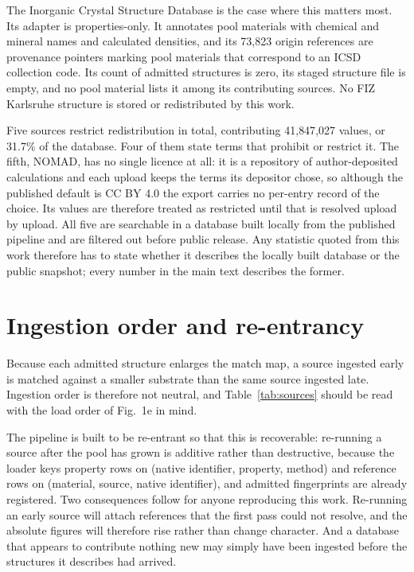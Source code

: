 The Inorganic Crystal Structure Database is the case where this matters most. Its
adapter is properties-only. It annotates pool materials with chemical and mineral
names and calculated densities, and its 73{,}823 origin references are provenance
pointers marking pool materials that correspond to an ICSD collection code. Its
count of admitted structures is zero, its staged structure file is empty, and no
pool material lists it among its contributing sources. No FIZ Karlsruhe structure is
stored or redistributed by this work.

Five sources restrict redistribution in total, contributing 41{,}847{,}027
values, or 31.7\% of the database. Four of them state terms that prohibit or
restrict it. The fifth, NOMAD, has no single licence at all: it is a repository
of author-deposited calculations and each upload keeps the terms its depositor
chose, so although the published default is CC BY 4.0 the export carries no
per-entry record of the choice. Its values are therefore treated as restricted
until that is resolved upload by upload. All five are searchable in a database
built locally from the published pipeline and are filtered out before public
release. Any
statistic quoted from this work therefore has to state whether it describes the
locally built database or the public snapshot; every number in the main text
describes the former.

\section{Ingestion order and re-entrancy}\label{note:order}

Because each admitted structure enlarges the match map, a source ingested early
is matched against a smaller substrate than the same source ingested late. Ingestion
order is therefore not neutral, and Table~\ref{tab:sources} should be read with
the load order of Fig.~1e in mind.

The pipeline is built to be re-entrant so that this is recoverable: re-running a
source after the pool has grown is additive rather than destructive, because the
loader keys property rows on (native identifier, property, method) and reference
rows on (material, source, native identifier), and admitted fingerprints are
already registered. Two consequences follow for anyone reproducing this work.
Re-running an early source will attach references that the first pass could not
resolve, and the absolute figures will therefore rise rather than change
character. And a database that appears to contribute nothing new may simply have
been ingested before the structures it describes had arrived.

